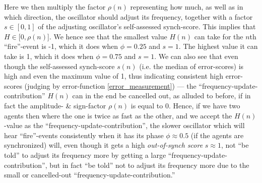 		Here we then multiply the factor $\rho(n)$ representing how much, as well as in which direction, the oscillator should adjust its frequency, together with a factor $s \in [0,1]$ of the adjusting oscillator's self-assessed synch-score. This implies that $H \in [0, \rho(n)$]. We hence see that the smallest value $H(n)$ can take for the $n$th ``fire''-event is -1, which it does when $\phi = 0.25$ and $s = 1$. The highest value it can take is 1, which it does when $\phi = 0.75$ and $s = 1$. We can also see that even though the self-assessed synch-score $s(n)$ (i.e. the median of error-scores) is high and even the maximum value of 1, thus indicating consistent high error-scores (judging by error-function \eqref{error_measurement}) — the ``frequency-update-contribution'' $H(n)$ can in the end be cancelled out, as alluded to before, if in fact the amplitude- \& sign-factor $\rho(n)$ is equal to 0. Hence, if we have two agents then where the one is twice as fast as the other, and we accept the $H(n)$-value as the ``frequency-update-contribution'', the slower oscillator which will hear ``fire''-events consistently when it has its phase $\phi \approx 0.5$ (if the agents are synchronized) will, even though it gets a high \textit{out-of-synch score} $s \approx 1$, not ``be told'' to adjust its frequency more by getting a large ``frequency-update-contribution'', but in fact ``be told'' not to adjust its frequency more due to the small or cancelled-out ``frequency-update-contribution.''


